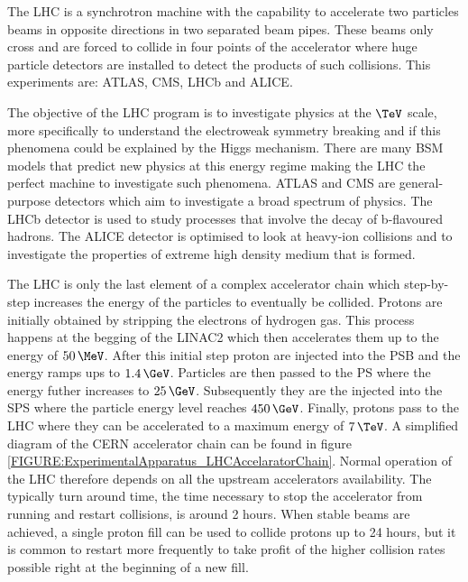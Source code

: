 The \gls{LHC} is a synchrotron machine with the capability to accelerate two particles beams in opposite directions in two separated beam pipes. These beams only cross and are forced to collide in four points of the accelerator where huge particle detectors are installed to detect the products of such collisions. This experiments are: \gls{ATLAS}\cite{ARTICLE:TheATLASExperiment}, \gls{CMS}\cite{ARTICLE:TheCMSExperiment}, \gls{LHCb}\cite{ARTICLE:TheLHCbExperiment} and \gls{ALICE}\cite{ARTICLE:TheALICEExperiment}.

The objective of the \gls{LHC} program is to investigate physics at the $\TeV$ scale, more specifically to understand the electroweak symmetry breaking and if this phenomena could be explained by the Higgs mechanism. There are many \gls{BSM} models that predict new physics at this energy regime making the \gls{LHC} the perfect machine to investigate such phenomena. \gls{ATLAS} and \gls{CMS} are general-purpose detectors which aim to investigate a broad spectrum of physics. The \gls{LHCb} detector is used to study processes that involve the decay of b-flavoured hadrons. The \gls{ALICE} detector is optimised to look at heavy-ion collisions and to investigate the properties of extreme high density medium that is formed.

The \gls{LHC} is only the last element of a complex accelerator chain which step-by-step increases the energy of the particles to eventually be collided. Protons are initially obtained by stripping the electrons of hydrogen gas. This process happens at the begging of the \gls{LINAC2} which then accelerates them up to the energy of $50\,\MeV$. After this initial step proton are injected into the \gls{PSB} and the energy ramps ups to $1.4\,\GeV$. Particles are then passed to the \gls{PS} where the energy futher increases to $25\,\GeV$. Subsequently they are the injected into the \gls{SPS} where the particle energy level reaches $450\,\GeV$. Finally, protons pass to the \gls{LHC} where they can be accelerated to a maximum energy of $7\,\TeV$. A simplified diagram of the \gls{CERN} accelerator chain can be found in figure \ref{FIGURE:ExperimentalApparatus_LHCAccelaratorChain}. 
Normal operation of the \gls{LHC} therefore depends on all the upstream accelerators availability. The typically turn around time, the time necessary to stop the accelerator from running and restart collisions, is around 2 hours. When stable beams are achieved, a single proton fill can be used to collide protons up to 24 hours, but it is common to restart more frequently to take profit of the higher collision rates possible right at the beginning of a new fill.

